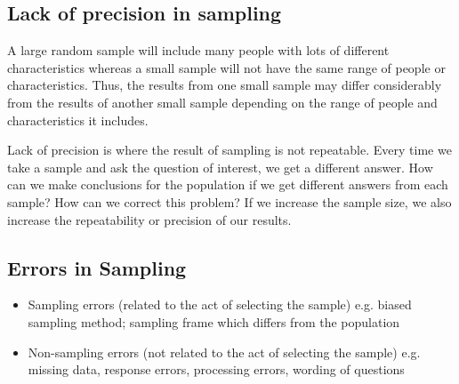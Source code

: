 ﻿\documentclass[]{report}
\begin{document}

\subsection{Lack of precision in sampling }
A large random sample will include many people with lots of different characteristics whereas a small sample will not have the same range of people or characteristics. Thus, the results from one small sample may differ considerably from the results of another small sample depending on the range of people and characteristics it includes.

Lack of precision is where the result of sampling is not repeatable. Every time we take a sample and ask the question of interest, we get a different answer. How can we make conclusions for the population if we get different answers from each sample? How can we correct this problem? If we increase the sample size, we also increase the repeatability or precision of our results. 



\subsection{Errors in Sampling}

\begin{itemize}
\item Sampling errors (related to the act of selecting the sample) e.g. biased sampling method; sampling frame which differs from the population

\item Non-sampling errors (not related to the act of selecting the sample) e.g. missing data, response errors, processing errors, wording of questions 
\end{itemize}
\end{document}

